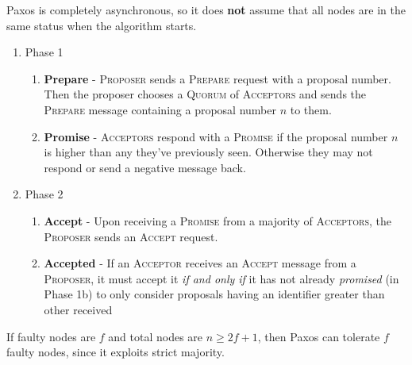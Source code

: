 Paxos is completely asynchronous, so it does \textbf{not} assume that all nodes are in the same status when the algorithm starts.


\begin{enumerate}
   \item Phase 1
   \begin{enumerate}[label=\alph*.]
      \item \textbf{Prepare} - 
      \textsc{Proposer} sends a \textsc{Prepare} request with a proposal number. Then the proposer chooses a \textsc{Quorum} of \textsc{Acceptors} and sends the \textsc{Prepare} message containing a proposal number $n$ to them.
      \item \textbf{Promise} - 
      \textsc{Acceptors} respond with a \textsc{Promise} if the proposal number $n$ is higher than any they've previously seen. Otherwise they may not respond or send a negative message back.
   \end{enumerate}
   \item Phase 2
   \begin{enumerate}[label=\alph*.]
      \item \textbf{Accept} -
      Upon receiving a \textsc{Promise} from a majority of \textsc{Acceptors}, the \textsc{Proposer} sends an \textsc{Accept} request.
      \item \textbf{Accepted} -
      If an \textsc{Acceptor} receives an \textsc{Accept} message from a \textsc{Proposer}, it must accept it \textit{if and only if} it has not already \textit{promised} (in Phase 1b) to only consider proposals having an identifier greater than other received
   \end{enumerate}
\end{enumerate}

If faulty nodes are $f$ and total nodes are $n \geq 2f + 1 $, then Paxos can tolerate $f$ faulty nodes, since it exploits strict majority.

